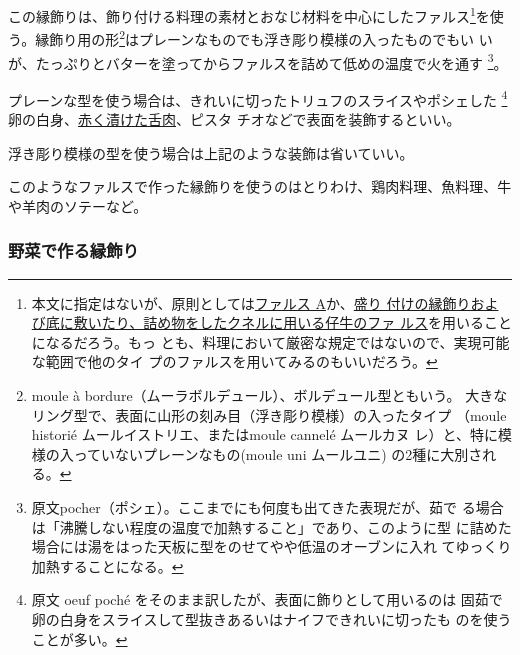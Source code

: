 \begin{recette}
この縁飾りは、飾り付ける料理の素材とおなじ材料を中心にしたファルス\footnote{本文に指定はないが、原則としては\protect\hyperlink{farce-a}{ファルス
  A}か、\protect\hyperlink{farce-de-veau-pour-bordures}{盛り
  付けの縁飾りおよび底に敷いたり、詰め物をしたクネルに用いる仔牛のファ
  ルス}を用いることになるだろう。もっ
  とも、料理において厳密な規定ではないので、実現可能な範囲で他のタイ
  プのファルスを用いてみるのもいいだろう。}を使
う。縁飾り用の形\footnote{moule à
  bordure（ムーラボルデュール）、ボルデュール型ともいう。
  大きなリング型で、表面に山形の刻み目（浮き彫り模様）の入ったタイプ
  （moule historié ムールイストリエ、またはmoule cannelé ムールカヌ
  レ）と、特に模様の入っていないプレーンなもの(moule uni ムールユニ)
  の2種に大別される。}はプレーンなものでも浮き彫り模様の入ったものでもい
いが、たっぷりとバターを塗ってからファルスを詰めて低めの温度で火を通す
\footnote{原文pocher（ポシェ）。ここまでにも何度も出てきた表現だが、茹で
  る場合は「沸騰しない程度の温度で加熱すること」であり、このように型
  に詰めた場合には湯をはった天板に型をのせてやや低温のオーブンに入れ
  てゆっくり加熱することになる。}。

プレーンな型を使う場合は、きれいに切ったトリュフのスライスやポシェした
\footnote{原文 oeuf poché をそのまま訳したが、表面に飾りとして用いるのは
  固茹で卵の白身をスライスして型抜きあるいはナイフできれいに切ったも
  のを使うことが多い。}卵の白身、\protect\hyperlink{saumure-liquide-pour-langues}{赤く漬けた舌肉}、ピスタ
チオなどで表面を装飾するといい。

浮き彫り模様の型を使う場合は上記のような装飾は省いていい。

このようなファルスで作った縁飾りを使うのはとりわけ、鶏肉料理、魚料理、牛や羊肉のソテーなど。

\hypertarget{bordures-en-legumes}{%
\subsubsection{野菜で作る縁飾り}\label{bordures-en-legumes}}




\end{recette}
